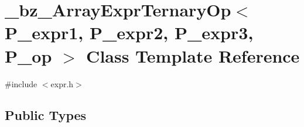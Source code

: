 \hypertarget{class__bz__ArrayExprTernaryOp}{}\section{\+\_\+bz\+\_\+\+Array\+Expr\+Ternary\+Op$<$ P\+\_\+expr1, P\+\_\+expr2, P\+\_\+expr3, P\+\_\+op $>$ Class Template Reference}
\label{class__bz__ArrayExprTernaryOp}


{\ttfamily \#include $<$expr.\+h$>$}

\subsection*{Public Types}
